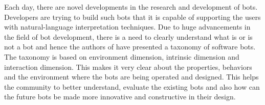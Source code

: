 Each day, there are novel developments in the research and development of bots. Developers are trying to build such bots that it is capable of supporting the users with natural-language interpretation techniques.  Due to huge advancements in the field of bot development, there is a need to clearly understand what is or is not a bot and hence the authors of \cite{lebeuf_defining_2019} have presented a taxonomy of software bots. The taxonomy is based on environment dimension, intrinsic dimension and interaction dimension. This makes it very clear about the properties, behaviors and the environment where the bots are being operated and designed. This helps the community to better understand, evaluate the existing bots and also how can the future bots be made more innovative and constructive in their design. 


